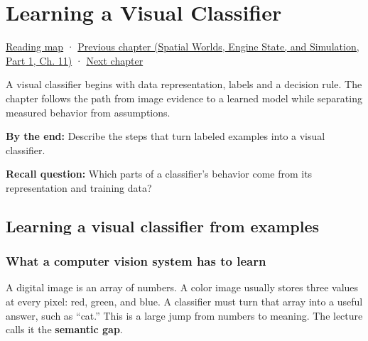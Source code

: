 \chapter{Learning a Visual Classifier}\label{04-visual-computing-ii-ch031-learning-a-visual-classifier}\hypertarget{04-visual-computing-ii-ch031}{}\label{stagechapter:04-visual-computing-ii-ch031}

\hypertarget{04-visual-computing-ii-ch031-learning-a-visual-classifier}{}

\hyperref[volume-reading-map]{Reading map} · \href{../05-Spatial-Worlds-Engine-State-and-Simulation-P01/main.pdf\#nameddest=04-visual-computing-ii-ch030-mesh-operators-boundaries-and-diffusion}{Previous chapter (Spatial Worlds, Engine State, and Simulation, Part 1, Ch. 11)} · \hyperref[04-visual-computing-ii-ch032-pose-estimation-and-robust-fitting]{Next chapter}

A visual classifier begins with data representation, labels and a decision rule. The chapter follows the path from image evidence to a learned model while separating measured behavior from assumptions.

\textbf{By the end:} Describe the steps that turn labeled examples into a visual classifier.

\textbf{Recall question:} Which parts of a classifier's behavior come from its representation and training data?

\section{Learning a visual classifier from examples}\label{04-visual-computing-ii-ch031-learning-a-visual-classifier-from-examples}

\hypertarget{04-visual-computing-ii-ch031-learning-a-visual-classifier-from-examples}{}

\subsection{What a computer vision system has to learn}\label{04-visual-computing-ii-ch031-what-a-computer-vision-system-has-to-learn}

\hypertarget{04-visual-computing-ii-ch031-what-a-computer-vision-system-has-to-learn}{}

A digital image is an array of numbers. A color image usually stores three values at every pixel: red, green, and blue. A classifier must turn that array into a useful answer, such as ``cat.'' This is a large jump from numbers to meaning. The lecture calls it the \textbf{semantic gap}.

